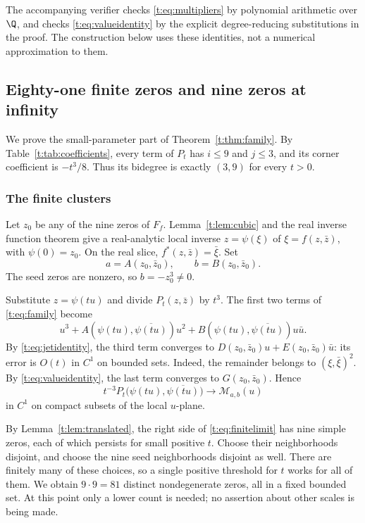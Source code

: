 \documentclass[UTF8,11pt]{ctexart}
\theoremstyle{definition}
\numberwithin{equation}{section}
\begin{document}
The accompanying verifier checks \eqref{t:eq:multipliers} by polynomial
arithmetic over $\Q$, and checks \eqref{t:eq:valueidentity} by the
explicit degree-reducing substitutions in the proof. The construction
below uses these identities, not a numerical approximation to them.

\subsection{Eighty-one finite zeros and nine zeros at infinity}\label{t:sec:construction}

We prove the small-parameter part of Theorem~\ref{t:thm:family}.
By Table~\ref{t:tab:coefficients}, every term of $P_t$ has
$i\le9$ and $j\le3$, and its corner coefficient is $-t^3/8$. Thus
its bidegree is exactly $(3,9)$ for every $t>0$.

\subsubsection{The finite clusters}
Let $z_0$ be any of the nine zeros of $F_f$. Lemma~\ref{t:lem:cubic}
and the real inverse function theorem give a real-analytic local
inverse $z=\psi(\xi)$ of $\xi=f(z,\bar z)$, with $\psi(0)=z_0$.
On the real slice, $f^*(z,\bar z)=\bar\xi$. Set
\[
 a=A(z_0,\bar z_0),\qquad b=B(z_0,\bar z_0).
\]
The seed zeros are nonzero, so $b=-z_0^3\ne0$.

Substitute $z=\psi(tu)$ and divide $P_t(z,\bar z)$ by $t^3$.
The first two terms of \eqref{t:eq:family} become
\[
 u^3+A(\psi(tu),\overline{\psi(tu)})u^2
       +B(\psi(tu),\overline{\psi(tu)})u\bar u.
\]
By \eqref{t:eq:jetidentity}, the third term converges to
$D(z_0,\bar z_0)u+E(z_0,\bar z_0)\bar u$: its error is $O(t)$
in $C^1$ on bounded sets. Indeed, the remainder belongs to
$(\xi,\bar\xi)^2$. By \eqref{t:eq:valueidentity}, the last term
converges to $G(z_0,\bar z_0)$. Hence
\begin{equation}\label{t:eq:finitelimit}
 t^{-3}P_t\bigl(\psi(tu),\overline{\psi(tu)}\bigr)
 \longrightarrow \mathcal M_{a,b}(u)
\end{equation}
in $C^1$ on compact subsets of the local $u$-plane.

By Lemma~\ref{t:lem:translated}, the right side of
\eqref{t:eq:finitelimit} has nine simple zeros, each of which persists
for small positive $t$. Choose their
neighborhoods disjoint, and choose the nine seed neighborhoods disjoint
as well. There are finitely many of these choices, so a single
positive threshold for $t$ works for all of them. We obtain
$9\cdot9=81$ distinct nondegenerate zeros, all in a fixed bounded set.
At this point only a lower count is needed; no assertion about other
scales is being made.
\end{document}
